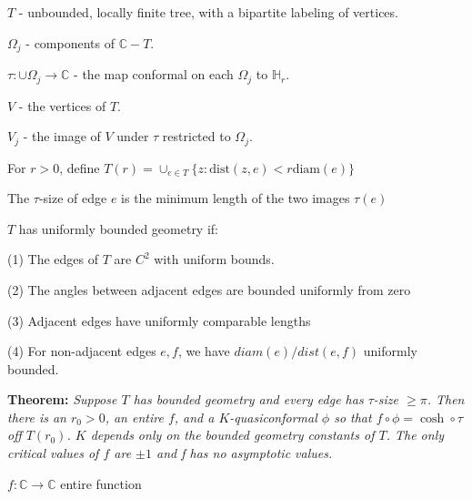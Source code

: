\documentclass{beamer}
\begin{document}
\begin{frame}

{\tiny $T$ - unbounded, locally finite tree, with a bipartite labeling of vertices.

$\Omega_j$ - components of $\mathbb{C}-T$.

$\tau: \cup \Omega_j \rightarrow \mathbb{C}$ - the map conformal on each $\Omega_j$ to $\mathbb{H}_r$.

$V$ - the vertices of $T$. 

$V_j$ - the image of $V$ under $\tau$ restricted to $\Omega_j$.

For $r > 0$, define $T(r) = \cup_{e\in T} \{z : \textrm{dist}(z,e) < r\textrm{diam}(e) \}$

The $\tau$-size of edge $e$ is the minimum length of the two images $\tau(e)$

\vspace{2.5mm}

$T$ has uniformly bounded geometry if: 

\hspace{5mm} (1) The edges of $T$ are $C^2$ with uniform bounds. 

\hspace{5mm} (2) The angles between adjacent edges are bounded uniformly from zero

\hspace{5mm} (3) Adjacent edges have uniformly comparable lengths

\hspace{5mm} (4) For non-adjacent edges $e, f$, we have $diam(e)/dist(e,f)$ uniformly bounded. 

 }
\vspace{5mm}
{\bf Theorem:} {\it  Suppose $T$ has bounded geometry and every edge has $\tau$-size $\geq \pi$.  Then there is an $r_0 > 0$, an entire $f$, and a $K$-quasiconformal $\phi$ so that $f \circ \phi = \cosh \circ \tau$ off $T(r_0)$. $K$ depends only on the bounded geometry constants of $T$. The only critical values of $f$ are $\pm 1$ and f has no asymptotic values.}  

\end{frame}







\begin{frame}

$f: \mathbb{C} \rightarrow \mathbb{C}$ entire function

\end{frame}
\end{document}
